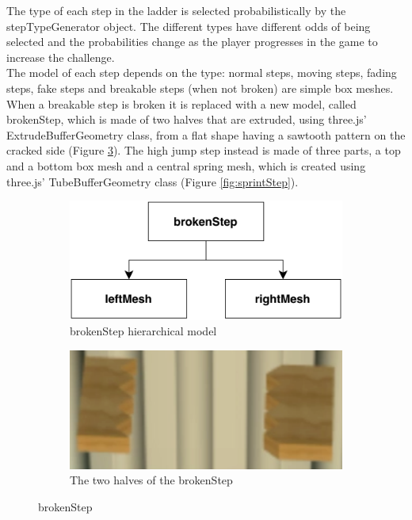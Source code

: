 \documentclass[12pt]{article}
\begin{document}
The type of each step in the ladder is selected probabilistically by the stepTypeGenerator object. The different types have different odds of being selected and the probabilities change as the player progresses in the game to increase the challenge.\\
The model of each step depends on the type: normal steps, moving steps, fading steps, fake steps and breakable steps (when not broken) are simple box meshes. When a breakable step is broken it is replaced with a new model, called brokenStep, which is made of two halves that are extruded, using three.js' ExtrudeBufferGeometry class, from a flat shape having a sawtooth pattern on the cracked side (Figure \ref{fig:brokenStep}). The high jump step instead is made of three parts, a top and a bottom box mesh and a central spring mesh, which is created using three.js' TubeBufferGeometry class (Figure \ref{fig:sprintStep}).

\begin{figure}[h]
\centering
\begin{subfigure}{.5\textwidth}
  \centering
  \includegraphics[width=.8\linewidth]{brokenStep}
  \caption{brokenStep hierarchical model}
  \label{fig:sub1}
\end{subfigure}%
\begin{subfigure}{.5\textwidth}
  \centering
  \includegraphics[width=.8\linewidth]{broken-step}
  \caption{The two halves of the brokenStep}
  \label{fig:sub2}
\end{subfigure}
\caption{brokenStep}
\label{fig:brokenStep}
\end{figure}
\end{document}
